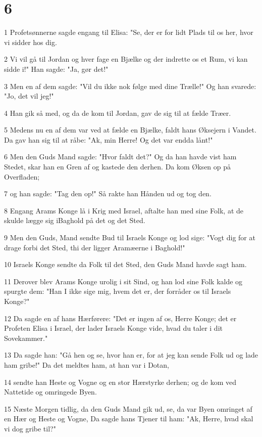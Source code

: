 \chapter{6}

\par 1 Profetsønnerne sagde engang til Elisa: "Se, der er for lidt Plads til os her, hvor vi sidder hos dig.
\par 2 Vi vil gå til Jordan og hver fage en Bjælke og der indrette os et Rum, vi kan sidde i!" Han sagde: "Ja, gør det!"
\par 3 Men en af dem sagde: "Vil du ikke nok følge med dine Trælle!" Og han svarede: "Jo, det vil jeg!"
\par 4 Han gik så med, og da de kom til Jordan, gav de sig til at fælde Træer.
\par 5 Medens nu en af dem var ved at fælde en Bjælke, faldt hans Øksejern i Vandet. Da gav han sig til at råbe: "Ak, min Herre! Og det var endda lånt!"
\par 6 Men den Guds Mand sagde: "Hvor faldt det?" Og da han havde vist ham Stedet, skar han en Gren af og kastede den derhen. Da kom Øksen op på Overfladen;
\par 7 og han sagde: "Tag den op!" Så rakte han Hånden ud og tog den.
\par 8 Engang Arams Konge lå i Krig med Israel, aftalte han med sine Folk, at de skulde lægge sig iBaghold på det og det Sted.
\par 9 Men den Guds, Mand sendte Bud til Israels Konge og lod sige: "Vogt dig for at drage forbi det Sted, thi der ligger Aramæerne i Baghold!"
\par 10 Israels Konge sendte da Folk til det Sted, den Guds Mand havde sagt ham.
\par 11 Derover blev Arams Konge urolig i sit Sind, og han lod sine Folk kalde og spurgte dem: "Han I ikke sige mig, hvem det er, der forråder os til Israels Konge?"
\par 12 Da sagde en af hans Hærførere: "Det er ingen af os, Herre Konge; det er Profeten Elisa i Israel, der lader Israels Konge vide, hvad du taler i dit Sovekammer."
\par 13 Da sagde han: "Gå hen og se, hvor han er, for at jeg kan sende Folk ud og lade ham gribe!" Da det meldtes ham, at han var i Dotan,
\par 14 sendte han Heste og Vogne og en stor Hærstyrke derhen; og de kom ved Nattetide og omringede Byen.
\par 15 Næste Morgen tidlig, da den Guds Mand gik ud, se, da var Byen omringet af en Hær og Heste og Vogne, Da sagde hans Tjener til ham: "Ak, Herre, hvad skal vi dog gribe til?"
